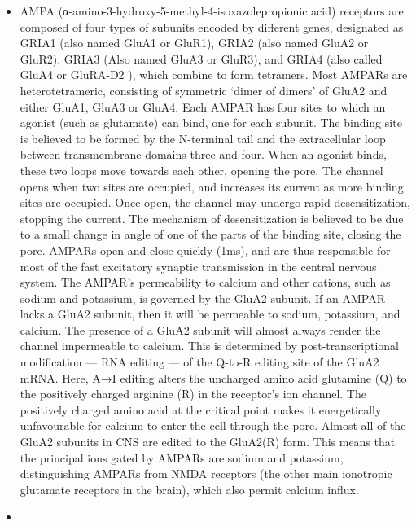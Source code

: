 \documentclass[]{book}
\providecommand{\tightlist}{%
  \setlength{\itemsep}{0pt}\setlength{\parskip}{0pt}}
\begin{document}
\begin{itemize}
  \begin{itemize}
  \tightlist
  \item
    AMPA (α-amino-3-hydroxy-5-methyl-4-isoxazolepropionic acid) receptors are composed of four types of subunits encoded by different genes, designated as GRIA1 (also named GluA1 or GluR1), GRIA2 (also named GluA2 or GluR2), GRIA3 (Also named GluA3 or GluR3), and GRIA4 (also called GluA4 or GluRA-D2 ), which combine to form tetramers. Most AMPARs are heterotetrameric, consisting of symmetric `dimer of dimers' of GluA2 and either GluA1, GluA3 or GluA4. Each AMPAR has four sites to which an agonist (such as glutamate) can bind, one for each subunit. The binding site is believed to be formed by the N-terminal tail and the extracellular loop between transmembrane domains three and four. When an agonist binds, these two loops move towards each other, opening the pore. The channel opens when two sites are occupied, and increases its current as more binding sites are occupied. Once open, the channel may undergo rapid desensitization, stopping the current. The mechanism of desensitization is believed to be due to a small change in angle of one of the parts of the binding site, closing the pore. AMPARs open and close quickly (1ms), and are thus responsible for most of the fast excitatory synaptic transmission in the central nervous system. The AMPAR's permeability to calcium and other cations, such as sodium and potassium, is governed by the GluA2 subunit. If an AMPAR lacks a GluA2 subunit, then it will be permeable to sodium, potassium, and calcium. The presence of a GluA2 subunit will almost always render the channel impermeable to calcium. This is determined by post-transcriptional modification --- RNA editing --- of the Q-to-R editing site of the GluA2 mRNA. Here, A→I editing alters the uncharged amino acid glutamine (Q) to the positively charged arginine (R) in the receptor's ion channel. The positively charged amino acid at the critical point makes it energetically unfavourable for calcium to enter the cell through the pore. Almost all of the GluA2 subunits in CNS are edited to the GluA2(R) form. This means that the principal ions gated by AMPARs are sodium and potassium, distinguishing AMPARs from NMDA receptors (the other main ionotropic glutamate receptors in the brain), which also permit calcium influx.
  \item

\end{itemize}
\end{itemize}
\end{document}
